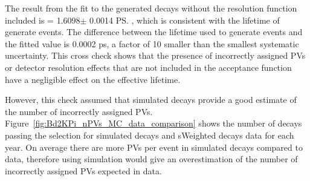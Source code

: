 The result from the fit to the generated decays without the resolution function included is \tmumu = 1.6098$\pm$ 0.0014 \ps, which is consistent with the lifetime of generate events. The difference between the lifetime used to generate events and the fitted value is 0.0002 ps, a factor of 10 smaller than the smallest systematic uncertainty. This cross check shows that the presence of incorrectly assigned PVs or detector resolution effects that are not included in the acceptance function have a negligible effect on the \bsmumu effective lifetime.



However, this check assumed that simulated decays provide a good estimate of the number of incorrectly assigned PVs. Figure~\ref{fig:Bd2KPi_nPVs_MC_data_comparison} shows the number of \bdkpi decays passing the selection for simulated \bdkpi decays and sWeighted decays data for each year. On average there are more PVs per event in simulated decays compared to data, therefore using simulation would give an overestimation of the number of incorrectly assigned PVs expected in data. 

